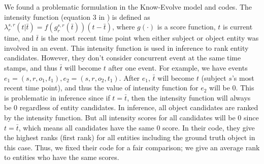 \documentclass[11pt,a4paper]{article}
\newcommand{\xiang}[1]{{{\textcolor{red}{[Xiang: #1]}}}}
\newcommand{\method}{\textsc{RE-Net}\xspace}
\newcommand{\para}[1]{\smallskip\noindent\textbf{#1}}
\begin{document}
We found a problematic formulation in the Know-Evolve model and codes.
The intensity function (equation 3 in \citep{Trivedi2017KnowEvolveDT}) is defined as 
$\lambda_r^{s,r}(t|\bar{t})=f(g_r^{s,r}(\bar{t}))(t-\bar{t})$, where $g(\cdot)$ is a score function, $t$ is current time, and $\bar{t}$ is the most recent time point when either subject or object entity was involved in an event.
This intensity function is used in inference to rank entity candidates.
However, they don't consider concurrent event at the same time stamps, and thus $\bar{t}$ will become $t$ after one event.
For example, we have events $e_1=(s,r,o_1, t_1), e_2=(s, r, o_2, t_1)$.
After $e_1$, $\bar{t}$ will become $t$ (subject $s$'s most recent time point), and thus the value of intensity function for $e_2$ will be 0.
This is problematic in inference since if $t=\bar{t}$, then the intensity function will always be 0 regardless of entity candidates. 
In inference, all object candidates are ranked by the intensity function.
But all intensity scores for all candidates will be 0 since $t=\bar{t}$, which means all candidates have the same 0 score.
In their code, they give the highest ranks (first rank) for all entities including the ground truth object in this case.
Thus, we fixed their code for a fair comparison; we give an average rank to entities who have the same scores.

\end{document}
